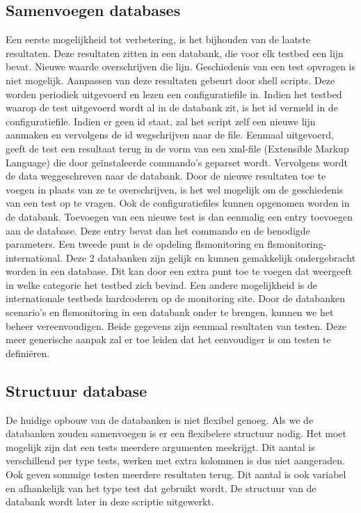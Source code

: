 \subsection{Samenvoegen databases}
\npar
Een eerste mogelijkheid tot verbetering, is het bijhouden van de laatste resultaten.
Deze resultaten zitten in een databank, die voor elk testbed een lijn bevat. Nieuwe waarde overschrijven die lijn. Geschiedenis van een test opvragen is niet mogelijk. Aanpassen van deze resultaten gebeurt door shell scripts. Deze worden periodiek uitgevoerd en lezen een configuratiefile in. Indien het testbed waarop de test uitgevoerd wordt al in de databank zit, is het id vermeld in de configuratiefile. Indien er geen id staat, zal het script zelf een nieuwe lijn aanmaken en vervolgens de id wegschrijven naar de file. Eenmaal uitgevoerd, geeft de test een resultaat terug in de vorm van een xml-file (Extensible Markup Language) die door ge\"instaleerde commando's geparset wordt. Vervolgens wordt de data weggeschreven naar de databank.
\npar
Door de nieuwe resultaten toe te voegen in plaats van ze te overschrijven, is het wel mogelijk om de geschiedenis van een test op te vragen.
Ook de configuratiefiles kunnen opgenomen worden in de databank. Toevoegen van een nieuwe test is dan eenmalig een entry toevoegen aan de database.
Deze entry bevat dan het commando en de benodigde parameters.
\npar
Een tweede punt is de opdeling flsmonitoring en flsmonitoring-international. Deze 2 databanken zijn gelijk en kunnen gemakkelijk ondergebracht worden in een database.
Dit kan door een extra punt toe te voegen dat weergeeft in welke categorie het testbed zich bevind. Een andere mogelijkheid is de internationale testbeds hardcoderen op de monitoring site.
\npar
Door de databanken scenario's en flsmonitoring in een databank onder te brengen, kunnen we het beheer vereenvoudigen.
Beide gegevens zijn eenmaal resultaten van testen. Deze meer generische aanpak zal er toe leiden dat het eenvoudiger is om testen te defini\"eren.

\subsection{Structuur database}
\npar
De huidige opbouw van de databanken is niet flexibel genoeg. Als we de databanken zouden samenvoegen is er een flexibelere structuur nodig.
Het moet mogelijk zijn dat een tests meerdere argumenten meekrijgt. Dit aantal is verschillend per type tests, werken met extra kolommen is dus niet aangeraden.
Ook geven sommige testen meerdere resultaten terug. Dit aantal is ook variabel en afhankelijk van het type test dat gebruikt wordt.
De structuur van de databank wordt later in deze scriptie uitgewerkt.

